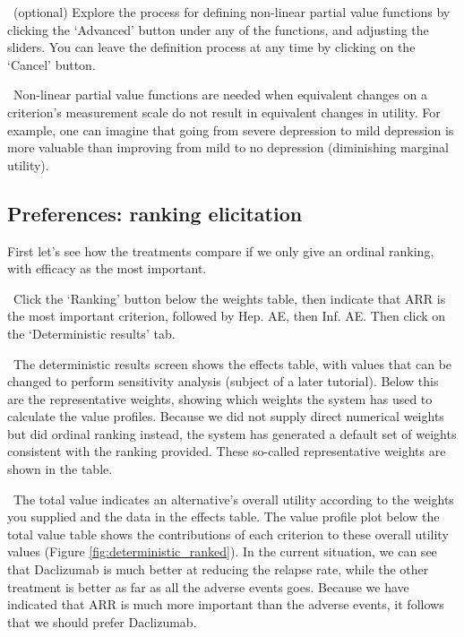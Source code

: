 \documentclass[00_mcda_tutorial.tex]{subfiles}
\begin{document}
\noindent \leftpointright \, (optional) Explore the process for defining non-linear partial value functions by clicking the ‘Advanced’ button under any of the functions, and adjusting the sliders. You can leave the definition process at any time by clicking on the ‘Cancel’ button.
\newline

\noindent \faGraduationCap \, Non-linear partial value functions are needed when equivalent changes on a criterion’s measurement scale do not result in equivalent changes in utility.  For example, one can imagine that going from severe depression to mild depression is more valuable than improving from mild to no depression (diminishing marginal utility).

\subsection*{Preferences: ranking elicitation}
First let’s see how the treatments compare if we only give an ordinal ranking, with efficacy as the most important.
\newline

\noindent \leftpointright \, Click the ‘Ranking’ button below the weights table, then indicate that ARR is the most important criterion, followed by Hep. AE, then Inf. AE. Then click on the ‘Deterministic results’ tab.
\newline

\noindent \faGraduationCap \, The deterministic results screen shows the effects table, with values that can be changed to perform sensitivity analysis (subject of a later tutorial). Below this are the representative weights, showing which weights the system has used to calculate the value profiles. Because we did not supply direct numerical weights but did ordinal ranking instead, the system has generated a default set of weights consistent with the ranking provided. These so-called representative weights are shown in the table.
\newline

\noindent \faGraduationCap \, The total value indicates an alternative’s overall utility according to the weights you supplied and the data in the effects table. The value profile plot below the total value table shows the contributions of each criterion to these overall utility values (Figure \ref{fig:deterministic_ranked}). In the current situation, we can see that Daclizumab is much better at reducing the relapse rate, while the other treatment is better as far as all the adverse events goes. Because we have indicated that ARR is much more important than the adverse events, it follows that we should prefer Daclizumab.
\end{document}
